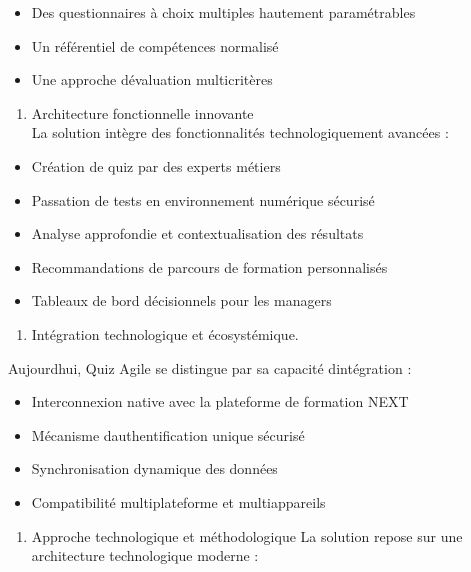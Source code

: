 \documentclass[12pt,a4paper,twoside]{report}
\begin{document}
\begin{itemize}
\item
  Des questionnaires à choix multiples hautement paramétrables
\item
  Un référentiel de compétences normalisé
\item
  Une approche d\textquotesingle évaluation multicritères
\end{itemize}

\begin{enumerate}
\def\labelenumi{\arabic{enumi}.}
\setcounter{enumi}{1}
\item
  Architecture fonctionnelle innovante~\\
  La solution intègre des fonctionnalités technologiquement avancées :
\end{enumerate}

\begin{itemize}
\item
  Création de quiz par des experts métiers
\item
  Passation de tests en environnement numérique sécurisé
\item
  Analyse approfondie et contextualisation des résultats
\item
  Recommandations de parcours de formation personnalisés
\item
  Tableaux de bord décisionnels pour les managers
\end{itemize}

\begin{enumerate}
\def\labelenumi{\arabic{enumi}.}
\setcounter{enumi}{2}
\item
  Intégration technologique et écosystémique.
\end{enumerate}

Aujourd\textquotesingle hui, Quiz Agile se distingue par sa capacité
d\textquotesingle intégration :

\begin{itemize}
\item
  Interconnexion native avec la plateforme de formation NEXT
\item
  Mécanisme d\textquotesingle authentification unique sécurisé
\item
  Synchronisation dynamique des données
\item
  Compatibilité multiplateforme et multiappareils
\end{itemize}

\begin{enumerate}
\def\labelenumi{\arabic{enumi}.}
\setcounter{enumi}{3}
\item
  Approche technologique et méthodologique La solution repose sur une
  architecture technologique moderne :
\end{enumerate}
\end{document}
